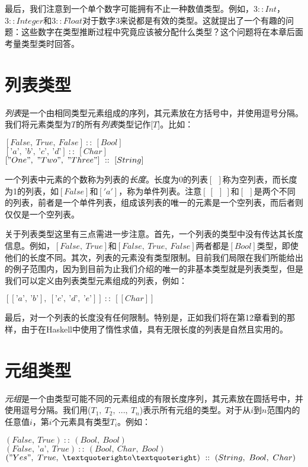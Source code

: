 最后，我们注意到一个单个数字可能拥有不止一种数值类型。例如，$3 :: Int$，$3 ::
Integer$和$3 ::
Float$对于数字$3$来说都是有效的类型。这就提出了一个有趣的问题：这些数字在类型推断过程中究竟应该被分配什么类型？这个问题将在本章后面考量类型类时回答。

\section{列表类型}
\textit{列表}是一个由相同类型元素组成的序列，其元素放在方括号中，并使用逗号分隔。我们将元素类型为$T$的所有\textit{列表}类型记作[$T$]。比如：

\noindent\hspace*{1cm} $[False,~True,~False]~::~[Bool]$\\
\hspace*{1cm} $[’a’,~’b’,~’c’,~’d’]~::~[Char]$\\
\hspace*{1cm} $["One",~"Two",~"Three"]~::~[String]$

一个列表中元素的个数称为列表的\textit{长度}。长度为0的列表$[~~]$称为空列表，而长度为1的列表，如$[False]$和$['a']$，称为单件列表。注意$[~[~~]~]$和$[~~]$是两个不同的列表，前者是一个单件列表，组成该列表的唯一的元素是一个空列表，而后者则仅仅是一个空列表。

关于列表类型这里有三点需进一步注意。首先，一个列表的类型中没有传达其长度信息。例如，$[False,~
True]$和$[False,~True,~
False]$两者都是$[Bool]$类型，即使他们的长度不同。其次，列表的元素没有类型限制。目前我们局限在我们所能给出的例子范围内，因为到目前为止我们介绍的唯一的非基本类型就是列表类型，但是我们可以定义由列表类型元素组成的列表，例如：

\noindent\hspace*{1cm} $[[’a’,~’b’],~[’c’,~’d’,~’e’]]~::~[[Char]]$

最后，对一个列表的长度没有任何限制。特别是，正如我们将在第12章看到的那样，由于在Haskell中使用了惰性求值，具有无限长度的列表是自然且实用的。

\section{元组类型}
\textit{元组}是一个由类型可能不同的元素组成的有限长度序列，其元素放在圆括号中，并使用逗号分隔。我们用($T_1,~T_2,~...,~T_n$)表示所有元组的类型。对于从$i$到$n$范围内的任意值$i$，第$i$个元素具有类型$T_i$。例如：

\noindent\hspace*{1cm} $(False,~True)~::~(Bool,~Bool)$\\
\hspace*{1cm} $(False,~’a’,~True)~::~(Bool,~Char,~Bool)$\\
\hspace*{1cm} $("Yes",~True,~’a’)~::~(String,~Bool,~Char)$

